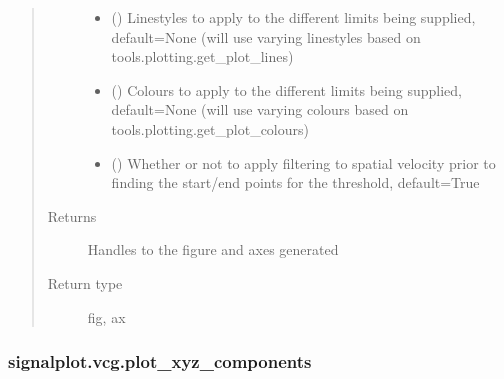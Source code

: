 \documentclass[letterpaper,10pt,english]{sphinxmanual}
\begin{document}
\begin{fulllineitems}
\begin{quote}
\begin{description}
\begin{itemize}
\item {} 
\sphinxAtStartPar
{} (\sphinxstyleliteralemphasis{\sphinxupquote{, }}) \textendash{} Linestyles to apply to the different limits being supplied, default=None (will use varying linestyles based
on tools.plotting.get\_plot\_lines)

\item {} 
\sphinxAtStartPar
{} (\sphinxstyleliteralemphasis{\sphinxupquote{, }}) \textendash{} Colours to apply to the different limits being supplied, default=None (will use varying colours based on
tools.plotting.get\_plot\_colours)

\item {} 
\sphinxAtStartPar
{} (\sphinxstyleliteralemphasis{\sphinxupquote{, }}) \textendash{} Whether or not to apply filtering to spatial velocity prior to finding the start/end points for the
threshold, default=True

\end{itemize}

\item[{Returns}] \leavevmode
\sphinxAtStartPar
Handles to the figure and axes generated

\item[{Return type}] \leavevmode
\sphinxAtStartPar
fig, ax

\end{description}\end{quote}

\end{fulllineitems}



\subsubsection{signalplot.vcg.plot\_xyz\_components}
\label{\detokenize{_autosummary/signalplot.vcg.plot_xyz_components:signalplot-vcg-plot-xyz-components}}\label{\detokenize{_autosummary/signalplot.vcg.plot_xyz_components::doc}}
\end{document}
